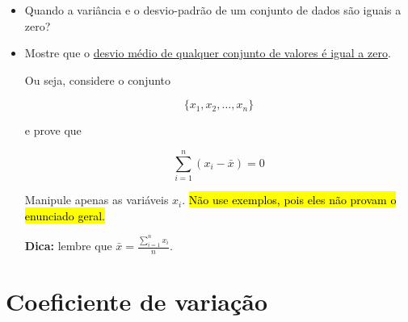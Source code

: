 \documentclass[
  11pt]{report}
\begin{document}
\begin{itemize}
\item
  Quando a variância e o desvio-padrão de um conjunto de dados são iguais a zero?
\item
  Mostre que o \protect\hyperlink{desvio-medio-zero}{desvio médio de qualquer conjunto de valores é igual a zero}.

  Ou seja, considere o conjunto

  \[
  \{x_1, x_2, \ldots, x_n\}
  \]

  e prove que

  \[
  \sum_{i = 1}^n (x_i - \bar x) = 0
  \]

  Manipule apenas as variáveis $x_i$. {\hl{Não use exemplos, pois eles não provam o enunciado geral.}}

  \textbf{Dica:} lembre que $\displaystyle \bar x = \frac{\sum_{i = 1}^n x_i}{n}$.
\end{itemize}

\hypertarget{coeficiente-de-variauxe7uxe3o}{%
\section{Coeficiente de variação}\label{coeficiente-de-variauxe7uxe3o}}
\end{document}
